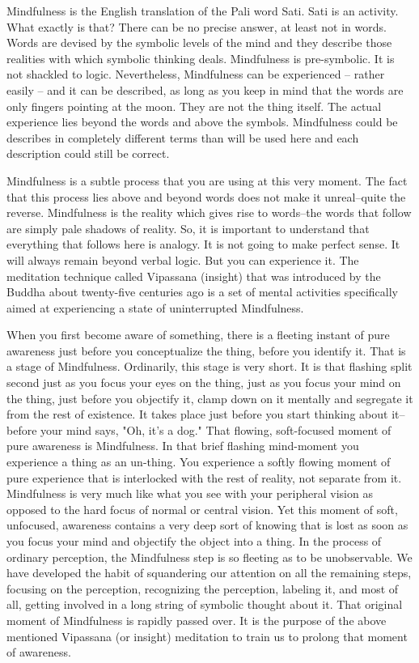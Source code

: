 Mindfulness is the English translation of the Pali word Sati. Sati is an activity. What exactly is that? There can be no precise
answer, at least not in words. Words are devised by the symbolic levels of the mind and they describe those realities with which
symbolic thinking deals. Mindfulness is pre-symbolic. It is not shackled to logic. Nevertheless, Mindfulness can be experienced --
rather easily -- and it can be described, as long as you keep in mind that the words are only fingers pointing at the moon. They are
not the thing itself. The actual experience lies beyond the words and above the symbols. Mindfulness could be describes in
completely different terms than will be used here and each description could still be correct.

Mindfulness is a subtle process that you are using at this very moment. The fact
that this process lies above and beyond words does not make it unreal--quite the
reverse. Mindfulness is the reality which gives rise to words--the words that
follow are simply pale shadows of reality. So, it is important to understand
that everything that follows here is analogy. It is not going to make perfect
sense. It will always remain beyond verbal logic. But you can experience it. The
meditation technique called Vipassana (insight) that was introduced by the
Buddha about twenty-five centuries ago is a set of mental activities
specifically aimed at experiencing a state of uninterrupted Mindfulness.

When you first become aware of something, there is a fleeting instant of pure
awareness just before you conceptualize the thing, before you identify it. That
is a stage of Mindfulness. Ordinarily, this stage is very short. It is that
flashing split second just as you focus your eyes on the thing, just as you
focus your mind on the thing, just before you objectify it, clamp down on it
mentally and segregate it from the rest of existence. It takes place just before
you start thinking about it--before your mind says, "Oh, it's a dog." That
flowing, soft-focused moment of pure awareness is Mindfulness. In that brief
flashing mind-moment you experience a thing as an un-thing. You experience a
softly flowing moment of pure experience that is interlocked with the rest of
reality, not separate from it. Mindfulness is very much like what you see with
your peripheral vision as opposed to the hard focus of normal or central vision.
Yet this moment of soft, unfocused, awareness contains a very deep sort of
knowing that is lost as soon as you focus your mind and objectify the object
into a thing. In the process of ordinary perception, the Mindfulness step is so
fleeting as to be unobservable. We have developed the habit of squandering our
attention on all the remaining steps, focusing on the perception, recognizing
the perception, labeling it, and most of all, getting involved in a long string
of symbolic thought about it. That original moment of Mindfulness is rapidly
passed over. It is the purpose of the above mentioned Vipassana (or insight)
meditation to train us to prolong that moment of awareness.

